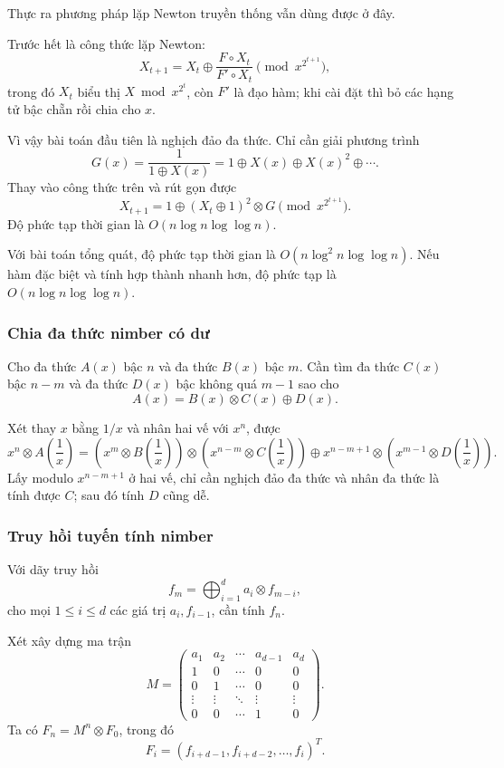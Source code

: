 \documentclass[11pt]{article}
\begin{document}
Thực ra phương pháp lặp Newton truyền thống vẫn dùng được ở đây.

Trước hết là công thức lặp Newton:
\[
  X_{t+1}=X_t\oplus
  \frac{F\circ X_t}{F'\circ X_t}\pmod {x^{2^{t+1}}},
\]
trong đó \(X_t\) biểu thị \(X\bmod x^{2^t}\), còn \(F'\) là đạo hàm; khi cài đặt
thì bỏ các hạng tử bậc chẵn rồi chia cho \(x\).

Vì vậy bài toán đầu tiên là nghịch đảo đa thức. Chỉ cần giải phương trình
\[
  G(x)=\frac1{1\oplus X(x)}
  =1\oplus X(x)\oplus X(x)^2\oplus\cdots.
\]
Thay vào công thức trên và rút gọn được
\[
  X_{t+1}=1\oplus (X_t\oplus 1)^2\otimes G \pmod {x^{2^{t+1}}}.
\]
Độ phức tạp thời gian là \(O(n\log n\log\log n)\).

Với bài toán tổng quát, độ phức tạp thời gian là
\(O(n\log^2 n\log\log n)\). Nếu hàm đặc biệt và tính hợp thành nhanh hơn, độ
phức tạp là \(O(n\log n\log\log n)\).

\subsubsection{Chia đa thức nimber có dư}

Cho đa thức \(A(x)\) bậc \(n\) và đa thức \(B(x)\) bậc \(m\). Cần tìm đa thức
\(C(x)\) bậc \(n-m\) và đa thức \(D(x)\) bậc không quá \(m-1\) sao cho
\[
  A(x)=B(x)\otimes C(x)\oplus D(x).
\]

Xét thay \(x\) bằng \(1/x\) và nhân hai vế với \(x^n\), được
\[
  x^n\otimes A\!\left(\frac1x\right)
  =
  \left(x^m\otimes B\!\left(\frac1x\right)\right)
  \otimes
  \left(x^{n-m}\otimes C\!\left(\frac1x\right)\right)
  \oplus
  x^{n-m+1}\otimes
  \left(x^{m-1}\otimes D\!\left(\frac1x\right)\right).
\]
Lấy modulo \(x^{n-m+1}\) ở hai vế, chỉ cần nghịch đảo đa thức và nhân đa thức
là tính được \(C\); sau đó tính \(D\) cũng dễ.

\subsubsection{Truy hồi tuyến tính nimber}

Với dãy truy hồi
\[
  f_m=\bigoplus_{i=1}^d a_i\otimes f_{m-i},
\]
cho mọi \(1\le i\le d\) các giá trị \(a_i,f_{i-1}\), cần tính \(f_n\).

Xét xây dựng ma trận
\[
M=
\begin{pmatrix}
a_1&a_2&\cdots&a_{d-1}&a_d\\
1&0&\cdots&0&0\\
0&1&\cdots&0&0\\
\vdots&\vdots&\ddots&\vdots&\vdots\\
0&0&\cdots&1&0
\end{pmatrix}.
\]
Ta có \(F_n=M^n\otimes F_0\), trong đó
\[
  F_i=(f_{i+d-1},f_{i+d-2},\ldots,f_i)^T.
\]
\end{document}
